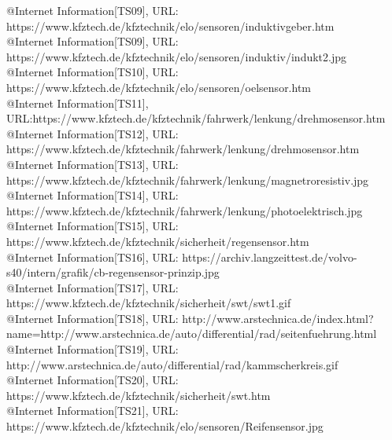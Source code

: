 \documentclass{article}
\begin{document}
@Internet{ Information[TS09],
	URL:
https://www.kfztech.de/kfztechnik/elo/sensoren/induktivgeber.htm\
\\

@Internet{ Information[TS09],
	URL: https://www.kfztech.de/kfztechnik/elo/sensoren/induktiv/indukt2.jpg}
\\

@Internet{ Information[TS10],
	URL: https://www.kfztech.de/kfztechnik/elo/sensoren/oelsensor.htm}
\\

@Internet{ Information[TS11],
	URL:https://www.kfztech.de/kfztechnik/fahrwerk/lenkung/drehmosensor.htm}
\\

@Internet{ Information[TS12],
	URL: https://www.kfztech.de/kfztechnik/fahrwerk/lenkung/drehmosensor.htm}
\\

@Internet{ Information[TS13],
	URL: https://www.kfztech.de/kfztechnik/fahrwerk/lenkung/magnetroresistiv.jpg}
\\

@Internet{ Information[TS14],
	URL: https://www.kfztech.de/kfztechnik/fahrwerk/lenkung/photoelektrisch.jpg}
\\

@Internet{ Information[TS15],
	URL: https://www.kfztech.de/kfztechnik/sicherheit/regensensor.htm}
\\

@Internet{ Information[TS16],
	URL: https://archiv.langzeittest.de/volvo-s40/intern/grafik/cb-regensensor-prinzip.jpg}
\\

@Internet{ Information[TS17],
	URL: https://www.kfztech.de/kfztechnik/sicherheit/swt/swt1.gif}
\\

@Internet{ Information[TS18],
	URL: http://www.arstechnica.de/index.html?name=http://www.arstechnica.de/auto/differential/rad/seitenfuehrung.html}
\\

@Internet{ Information[TS19],
	URL: http://www.arstechnica.de/auto/differential/rad/kammscherkreis.gif}
\\

@Internet{ Information[TS20],
	URL: https://www.kfztech.de/kfztechnik/sicherheit/swt.htm}
\\

@Internet{ Information[TS21],
	URL: https://www.kfztech.de/kfztechnik/elo/sensoren/Reifensensor.jpg}
\\

}
\end{document}
